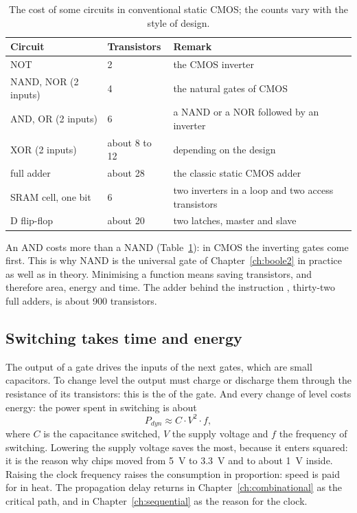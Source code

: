 \begin{table}[htb]
\centering\small
\caption{The cost of some circuits in conventional static CMOS; the counts
vary with the style of design.}\label{tab:el:cost}
\begin{tabular}{@{}lll@{}}
\toprule
\textbf{Circuit} & \textbf{Transistors} & \textbf{Remark}\\
\midrule
NOT & 2 & the CMOS inverter\\
NAND, NOR (2 inputs) & 4 & the natural gates of CMOS\\
AND, OR (2 inputs) & 6 & a NAND or a NOR followed by an inverter\\
XOR (2 inputs) & about 8 to 12 & depending on the design\\
full adder & about 28 & the classic static CMOS adder\\
SRAM cell, one bit & 6 & two inverters in a loop and two access transistors\\
D flip-flop & about 20 & two latches, master and slave\\
\bottomrule
\end{tabular}
\end{table}

An AND costs more than a NAND (Table~\ref{tab:el:cost}): in CMOS the
inverting gates come first. This is why NAND is the universal gate of
Chapter~\ref{ch:boole2} in practice as well as in theory. Minimising a
function means saving transistors, and therefore area, energy and time. The
adder behind the instruction , thirty-two full adders, is about 900
transistors.

\subsection{Switching takes time and energy}

The output of a gate drives the inputs of the next gates, which are small
capacitors. To change level the output must charge or discharge them through
the resistance of its transistors: this is the  of the
gate. And every change of level costs energy: the power spent in switching is
about
\[ P_{dyn} \approx C\cdot V^{2}\cdot f, \]
where $C$ is the capacitance switched, $V$ the supply voltage and $f$ the
frequency of switching. Lowering the supply voltage saves the most, because
it enters squared: it is the reason why chips moved from 5~V to 3.3~V and to
about 1~V inside. Raising the clock frequency raises the consumption in
proportion: speed is paid for in heat. The propagation delay returns in
Chapter~\ref{ch:combinational} as the critical path, and in
Chapter~\ref{ch:sequential} as the reason for the clock.


